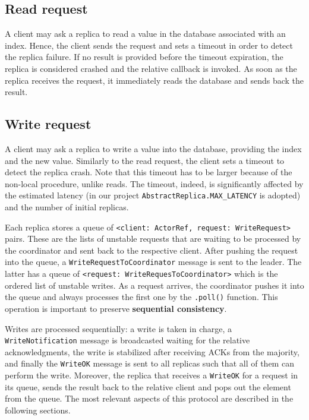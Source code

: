 \subsection{Read request}

A client may ask a replica to read a value in the database associated with an index. Hence, the client sends the request and sets a timeout in order to detect the replica failure. If no result is provided before the timeout expiration, the replica is considered crashed and the relative callback is invoked. As soon as the replica receives the request, it immediately reads the database and sends back the result.

\subsection{Write request}

A client may ask a replica to write a value into the database, providing the index and the new value. Similarly to the read request, the client sets a timeout to detect the replica crash. Note that this timeout has to be larger because of the non-local procedure, unlike reads. The timeout, indeed, is significantly affected by the estimated latency (in our project \texttt{AbstractReplica.MAX\_LATENCY} is adopted) and the number of initial replicas.

Each replica stores a queue of \texttt{<client: ActorRef, request: WriteRequest>} pairs. These are the lists of unstable requests that are waiting to be processed by the coordinator and sent back to the respective client. After pushing the request into the queue, a \texttt{WriteRequestToCoordinator} message is sent to the leader. The latter has a queue of \texttt{<request: WriteRequesToCoordinator>} which is the ordered list of unstable writes. As a request arrives, the coordinator pushes it into the queue and always processes the first one by the \texttt{.poll()} function. This operation is important to preserve \textbf{sequential consistency}.

Writes are processed sequentially: a write is taken in charge, a \texttt{WriteNotification} message is broadcasted waiting for the relative acknowledgments, the write is stabilized after receiving ACKs from the majority, and finally the \texttt{WriteOK} message is sent to all replicas such that all of them can perform the write. Moreover, the replica that receives a \texttt{WriteOK} for a request in its queue, sends the result back to the relative client and pops out the element from the queue. The most relevant aspects of this protocol are described in the following sections.

